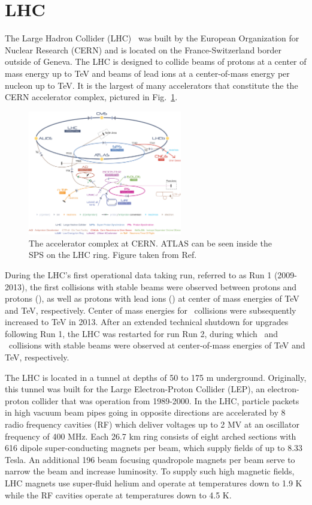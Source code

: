 
\section{LHC}
The Large Hadron Collider (LHC)~\cite{Evans:2008zzb} was built by the European Organization for Nuclear Research (CERN) and is located on the France-Switzerland border outside of Geneva. The LHC is designed to collide beams of protons at a center of mass energy up to  TeV and beams of lead ions at a center-of-mass energy per nucleon up to  TeV. It is the largest of many accelerators that constitute the the CERN accelerator complex, pictured in Fig.~\ref{fig:cern}. 

\begin{figure}[ht]
	\centering
	\includegraphics[width=0.60\textwidth]{figures/cern.jpg} %
	\caption{The accelerator complex at CERN. ATLAS can be seen inside the SPS on the LHC ring. Figure taken from Ref.~\cite{cernlhc}}
	\label{fig:cern}%
\end{figure}

During the LHC's first operational data taking run, referred to as Run 1 (2009-2013), the first collisions with stable beams were observed between protons and protons (\pp), as well as protons with lead ions (\pPb) at center of mass energies of  TeV and  TeV, respectively. Center of mass energies for \pPb\ collisions were subsequently increased to  TeV in 2013. After an extended technical shutdown for upgrades following Run 1, the LHC was restarted for run Run 2, during which \pp\ and \pPb\ collisions with stable beams were observed at center-of-mass energies of  TeV and  TeV, respectively. 

The LHC is located in a tunnel at depths of 50 to 175 m underground. Originally, this tunnel was built for the Large Electron-Proton Collider (LEP), an electron-proton collider that was operation from 1989-2000. In the LHC, particle packets in high vacuum beam pipes going in opposite directions are accelerated by 8 radio frequency cavities (RF) which deliver voltages up to 2 MV at an oscillator frequency of 400 MHz. Each 26.7 km ring consists of eight arched sections with 616 dipole super-conducting magnets per beam, which supply fields of up to 8.33 Tesla. An additional 196 beam focusing quadropole magnets per beam serve to narrow the beam and increase luminosity. To supply such high magnetic fields, LHC magnets use super-fluid helium and operate at temperatures down to 1.9 K while the RF cavities operate at temperatures down to 4.5 K.

